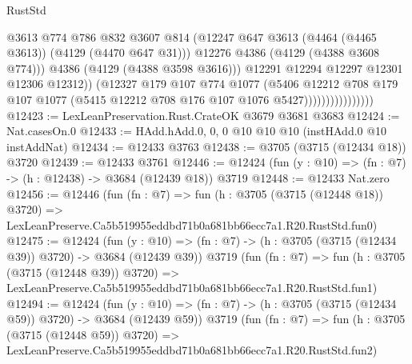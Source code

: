 \begin{lexlean}{RustStd}
\begin{coremodule}
                                      @3613
                                      @774
                                      @786
                                      @832
                                      @3607
                                      @814
                                      (@12247
                                        @647
                                        @3613
                                        (@4464 (@4465 @3613))
                                        (@4129 (@4470 @647 @31)))
                                      @12276
                                      @4386
                                      (@4129 (@4388 @3608 @774)))
                                    @4386
                                    (@4129 (@4388 @3598 @3616)))
                                  @12291
                                  @12294
                                  @12297
                                  @12301
                                  @12306
                                  @12312))
                              (@12327
                                @179
                                @107
                                @774
                                @1077
                                (@5406
                                  @12212
                                  @708
                                  @179
                                  @107
                                  @1077
                                  (@5415 @12212 @708 @176 @107 @1076 @5427))))))))))))))))
@12423 := LexLeanPreservation.Rust.CrateOK @3679 @3681 @3683
@12424 := Nat.casesOn.{0}
@12433 := HAdd.hAdd.{0, 0, 0} @10 @10 @10 (instHAdd.{0} @10 instAddNat)
@12434 := @12433 @3763
@12438 := @3705 (@3715 (@12434 @18)) @3720
@12439 := @12433 @3761
@12446 := @12424 (fun (y : @10) => (fn : @7) -> (h : @12438) -> @3684 (@12439 @18)) @3719
@12448 := @12433 Nat.zero
@12456 := @12446
    (fun (fn : @7) =>
    fun (h : @3705 (@3715 (@12448 @18)) @3720) =>
    LexLeanPreserve.Ca5b519955eddbd71b0a681bb66ecc7a1.R20.RustStd.fun0)
@12475 := @12424
    (fun (y : @10) => (fn : @7) -> (h : @3705 (@3715 (@12434 @39)) @3720) -> @3684 (@12439 @39))
    @3719
    (fun (fn : @7) =>
    fun (h : @3705 (@3715 (@12448 @39)) @3720) =>
    LexLeanPreserve.Ca5b519955eddbd71b0a681bb66ecc7a1.R20.RustStd.fun1)
@12494 := @12424
    (fun (y : @10) => (fn : @7) -> (h : @3705 (@3715 (@12434 @59)) @3720) -> @3684 (@12439 @59))
    @3719
    (fun (fn : @7) =>
    fun (h : @3705 (@3715 (@12448 @59)) @3720) =>
    LexLeanPreserve.Ca5b519955eddbd71b0a681bb66ecc7a1.R20.RustStd.fun2)

\end{coremodule}
\end{lexlean}
